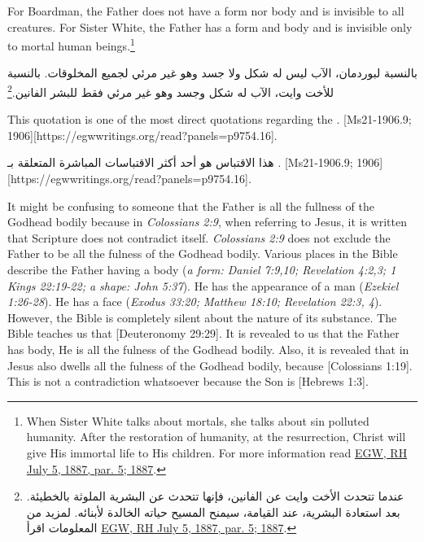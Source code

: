 For Boardman, the Father does not have a form nor body and is invisible to all creatures. For Sister White, the Father has a form and body and is invisible only to mortal human beings.\footnote{When Sister White talks about mortals, she talks about sin polluted humanity. After the restoration of humanity, at the resurrection, Christ will give His immortal life to His children. For more information read \href{https://egwwritings.org/?ref=en_RH.July.5.1887.par.5}{EGW, RH July 5, 1887, par. 5; 1887}.}


بالنسبة لبوردمان، الآب ليس له شكل ولا جسد وهو غير مرئي لجميع المخلوقات. بالنسبة للأخت وايت، الآب له شكل وجسد وهو غير مرئي فقط للبشر الفانين.\footnote{عندما تتحدث الأخت وايت عن الفانين، فإنها تتحدث عن البشرية الملوثة بالخطيئة. بعد استعادة البشرية، عند القيامة، سيمنح المسيح حياته الخالدة لأبنائه. لمزيد من المعلومات اقرأ \href{https://egwwritings.org/?ref=en_RH.July.5.1887.par.5}{EGW, RH July 5, 1887, par. 5; 1887}.}


This quotation is one of the most direct quotations regarding the . [Ms21-1906.9; 1906][https://egwwritings.org/read?panels=p9754.16].


هذا الاقتباس هو أحد أكثر الاقتباسات المباشرة المتعلقة بـ . [Ms21-1906.9; 1906][https://egwwritings.org/read?panels=p9754.16].


It might be confusing to someone that the Father is all the fullness of the Godhead bodily because in \textit{Colossians 2:9}, when referring to Jesus, it is written that  Scripture does not contradict itself. \textit{Colossians 2:9} does not exclude the Father to be all the fulness of the Godhead bodily. Various places in the Bible describe the Father having a body (\textit{a form: Daniel 7:9,10; Revelation 4:2,3; 1 Kings 22:19-22; a shape: John 5:37}). He has the appearance of a man (\textit{Ezekiel 1:26-28}). He has a face (\textit{Exodus 33:20; Matthew 18:10; Revelation 22:3, 4}). However, the Bible is completely silent about the nature of its substance. The Bible teaches us that [Deuteronomy 29:29]. It is revealed to us that the Father has body, He is all the fulness of the Godhead bodily. Also, it is revealed that in Jesus also dwells all the fulness of the Godhead bodily, because [Colossians 1:19]. This is not a contradiction whatsoever because the Son is [Hebrews 1:3].



